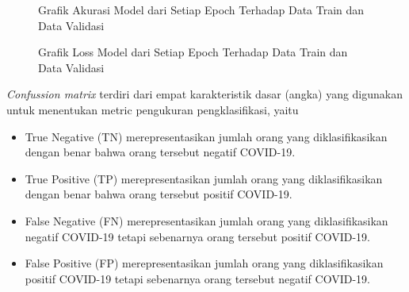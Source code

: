 \begin{figure}[h!]
  \centering
  \caption{Grafik Akurasi Model dari Setiap Epoch Terhadap Data Train dan Data Validasi}
  \label{his_acc}
\end{figure}


\begin{figure}
  \centering
  \caption{Grafik Loss Model dari Setiap Epoch Terhadap Data Train dan Data Validasi}
  \label{his_loss}
\end{figure}



\textit{Confussion matrix} terdiri dari empat karakteristik dasar (angka) yang digunakan untuk menentukan metric pengukuran pengklasifikasi, yaitu
\begin{itemize}
    \item True Negative (TN)
    merepresentasikan jumlah orang yang diklasifikasikan dengan benar bahwa orang tersebut negatif COVID-19.
    \item True Positive (TP)
    merepresentasikan jumlah orang yang diklasifikasikan dengan benar bahwa orang tersebut positif COVID-19.
    \item False Negative (FN)
    merepresentasikan jumlah orang yang diklasifikasikan negatif COVID-19 tetapi sebenarnya orang tersebut positif COVID-19.
    \item False Positive (FP)
    merepresentasikan jumlah orang yang diklasifikasikan positif COVID-19 tetapi sebenarnya orang tersebut negatif COVID-19.
\end{itemize}

